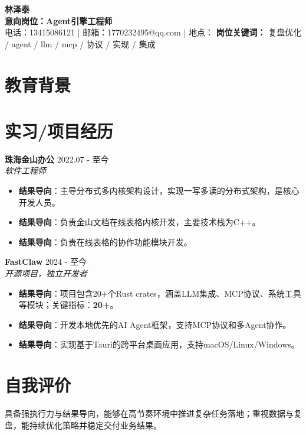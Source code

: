 \documentclass[a4paper,10pt]{article}
\begin{document}
\begin{center}
{\Huge \textbf{林泽泰}} \\
\vspace{0.15cm}
\textbf{意向岗位：Agent引擎工程师} \\
\vspace{0.1cm}
电话：13415086121 \quad | \quad 邮箱：1770232495@qq.com \quad | \quad 地点：
\vspace{0.08cm}
\textbf{岗位关键词：} 复盘优化 / agent / llm / mcp / 协议 / 实现 / 集成
\end{center}
\section*{教育背景}
\section*{实习/项目经历}
\textbf{珠海金山办公} \hfill 2022.07 - 至今 \\
\textit{软件工程师} \hfill 
\begin{itemize}[leftmargin=*, itemsep=2pt, parsep=0pt, topsep=2pt]
    \item \textbf{结果导向}：主导分布式多内核架构设计，实现一写多读的分布式架构，是核心开发人员。
    \item \textbf{结果导向}：负责金山文档在线表格内核开发，主要技术栈为C++。
    \item \textbf{结果导向}：负责在线表格的协作功能模块开发。
\end{itemize}
\textbf{FastClaw} \hfill 2024 - 至今 \\
\textit{开源项目，独立开发者} \hfill 
\begin{itemize}[leftmargin=*, itemsep=2pt, parsep=0pt, topsep=2pt]
    \item \textbf{结果导向}：项目包含20+个Rust crates，涵盖LLM集成、MCP协议、系统工具等模块；关键指标：\textbf{20+}。
    \item \textbf{结果导向}：开发本地优先的AI Agent框架，支持MCP协议和多Agent协作。
    \item \textbf{结果导向}：实现基于Tauri的跨平台桌面应用，支持macOS/Linux/Windows。
\end{itemize}
\section*{自我评价}
具备强执行力与结果导向，能够在高节奏环境中推进复杂任务落地；重视数据与复盘，能持续优化策略并稳定交付业务结果。
\end{document}
